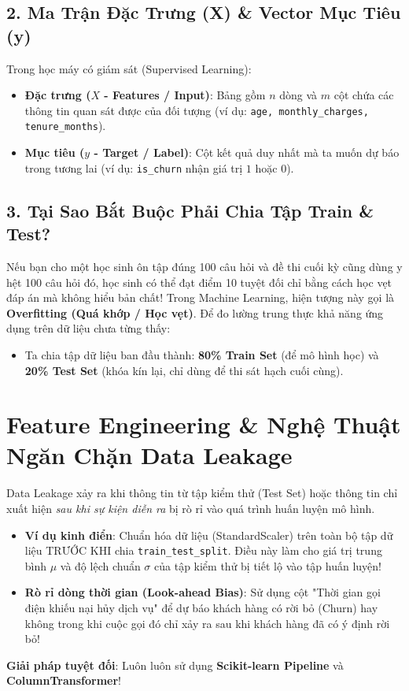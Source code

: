 \subsection{2. Ma Trận Đặc Trưng (X) \& Vector Mục Tiêu (y)}
Trong học máy có giám sát (Supervised Learning):
\begin{itemize}
    \item \textbf{Đặc trưng ($X$ - Features / Input)}: Bảng gồm $n$ dòng và $m$ cột chứa các thông tin quan sát được của đối tượng (ví dụ: \texttt{age, monthly\_charges, tenure\_months}).
    \item \textbf{Mục tiêu ($y$ - Target / Label)}: Cột kết quả duy nhất mà ta muốn dự báo trong tương lai (ví dụ: \texttt{is\_churn} nhận giá trị $1$ hoặc $0$).
\end{itemize}

\subsection{3. Tại Sao Bắt Buộc Phải Chia Tập Train \& Test?}
Nếu bạn cho một học sinh ôn tập đúng 100 câu hỏi và đề thi cuối kỳ cũng dùng y hệt 100 câu hỏi đó, học sinh có thể đạt điểm 10 tuyệt đối chỉ bằng cách học vẹt đáp án mà không hiểu bản chất!
Trong Machine Learning, hiện tượng này gọi là \textbf{Overfitting (Quá khớp / Học vẹt)}. Để đo lường trung thực khả năng ứng dụng trên dữ liệu chưa từng thấy:
\begin{itemize}
    \item Ta chia tập dữ liệu ban đầu thành: \textbf{80\% Train Set} (để mô hình học) và \textbf{20\% Test Set} (khóa kín lại, chỉ dùng để thi sát hạch cuối cùng).
\end{itemize}

\section{Feature Engineering \& Nghệ Thuật Ngăn Chặn Data Leakage}

\begin{lythuyetbox}
Data Leakage xảy ra khi thông tin từ tập kiểm thử (Test Set) hoặc thông tin chỉ xuất hiện \textit{sau khi sự kiện diễn ra} bị rò rỉ vào quá trình huấn luyện mô hình.
\begin{itemize}
    \item \textbf{Ví dụ kinh điển}: Chuẩn hóa dữ liệu (StandardScaler) trên toàn bộ tập dữ liệu TRƯỚC KHI chia \texttt{train\_test\_split}. Điều này làm cho giá trị trung bình $\mu$ và độ lệch chuẩn $\sigma$ của tập kiểm thử bị tiết lộ vào tập huấn luyện!
    \item \textbf{Rò rỉ dòng thời gian (Look-ahead Bias)}: Sử dụng cột "Thời gian gọi điện khiếu nại hủy dịch vụ" để dự báo khách hàng có rời bỏ (Churn) hay không trong khi cuộc gọi đó chỉ xảy ra sau khi khách hàng đã có ý định rời bỏ!
\end{itemize}
\textbf{Giải pháp tuyệt đối}: Luôn luôn sử dụng \textbf{Scikit-learn Pipeline} và \textbf{ColumnTransformer}!
\end{lythuyetbox}

